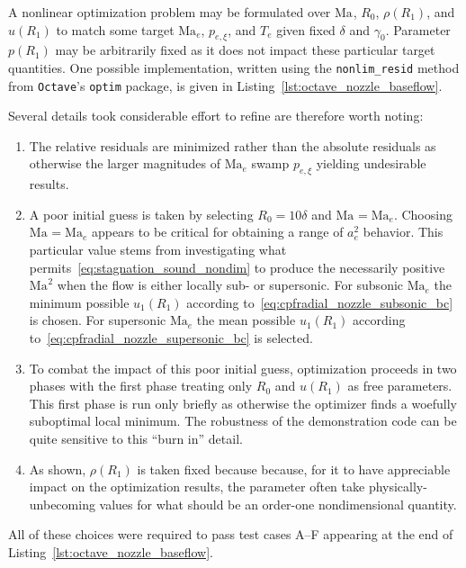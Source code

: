 \documentclass[letterpaper,11pt,nointlimits,reqno]{amsart}
\makeatletter
\newcommand{\Mach}[1][]{\ensuremath{\mbox{Ma}_{#1}}}
\newcommand\mynobreakpar{\par\nobreak\@afterheading}
\makeatother
\begin{document}
A nonlinear optimization problem may be formulated over $\Mach$, $R_0$,
$\rho\!\left(R_1\right)$, and $u\!\left(R_1\right)$ to match some target
$\Mach[e]{}$, $p_{e,\xi}$, and $T_e$ given fixed $\delta$ and $\gamma_0$.
Parameter $p\!\left(R_1\right)$ may be arbitrarily fixed as it does not impact
these particular target quantities.  One possible implementation, written using
the \texttt{nonlim\_resid} method from \texttt{Octave}'s \texttt{optim}
package, is given in Listing~\ref{lst:octave_nozzle_baseflow}.

Several details took considerable effort to refine are therefore worth
noting:\mynobreakpar
\begin{enumerate}
  \item The relative residuals are minimized rather than the absolute residuals
    as otherwise the larger magnitudes of $\Mach[e]{}$ swamp $p_{e,\xi}$
    yielding undesirable results.
  \item A poor initial guess is taken by selecting $R_0 = 10\delta$ and
    $\Mach{}=\Mach[e]{}$.  Choosing $\Mach{}=\Mach[e]{}$ appears to be critical
    for obtaining a range of $a_e^2$ behavior.  This particular value stems
    from investigating what permits~\eqref{eq:stagnation_sound_nondim} to
    produce the necessarily positive $\Mach^2$ when the flow is either locally
    sub- or supersonic.  For subsonic $\Mach[e]{}$ the minimum possible
    $u_1\!\left(R_1\right)$ according
    to~\eqref{eq:cpfradial_nozzle_subsonic_bc} is chosen.  For supersonic
    $\Mach[e]{}$ the mean possible $u_1\!\left(R_1\right)$ according
    to~\eqref{eq:cpfradial_nozzle_supersonic_bc} is selected.
  \item To combat the impact of this poor initial guess, optimization proceeds
    in two phases with the first phase treating only $R_0$ and
    $u\!\left(R_1\right)$ as free parameters.  This first phase is run only
    briefly as otherwise the optimizer finds a woefully suboptimal local
    minimum.  The robustness of the demonstration code can be quite sensitive
    to this ``burn in'' detail.
  \item As shown, $\rho\!\left(R_1\right)$ is taken fixed because because, for
    it to have appreciable impact on the optimization results, the parameter
    often take physically-unbecoming values for what should be an order-one
    nondimensional quantity.
\end{enumerate}
All of these choices were required to pass test cases A--F appearing at the end
of Listing~\ref{lst:octave_nozzle_baseflow}.
\end{document}
